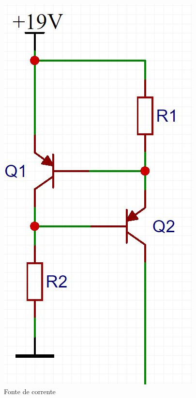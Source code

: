 \documentclass[11pt]{abntex2}
\begin{document}
				\begin{figure}[!ht]
					\centering
					\includegraphics[scale = 0.3]{../../Fotos/fonteCorrenteClean2.jpg}
					\caption{Fonte de corrente}
					\label{fig:topologiaFonteCorrente}
				\end{figure}
\end{document}
